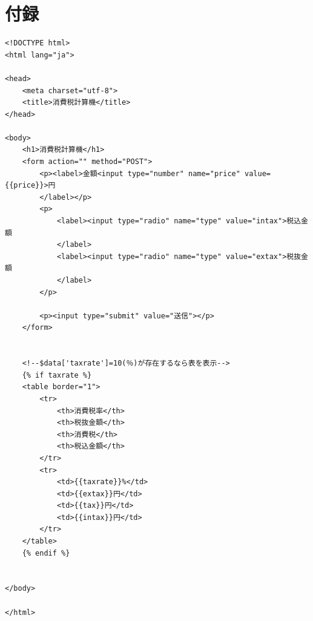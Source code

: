 \documentclass[12pt]{jarticle}
\begin{document}
\section{付録}
\begin{lstlisting}[style = lsthtml,caption=tax.html]
<!DOCTYPE html>
<html lang="ja">

<head>
    <meta charset="utf-8">
    <title>消費税計算機</title>
</head>

<body>
    <h1>消費税計算機</h1>
    <form action="" method="POST">
        <p><label>金額<input type="number" name="price" value={{price}}>円
        </label></p>
        <p>
            <label><input type="radio" name="type" value="intax">税込金額
            </label>
            <label><input type="radio" name="type" value="extax">税抜金額
            </label>
        </p>

        <p><input type="submit" value="送信"></p>
    </form>


    <!--$data['taxrate']=10(％)が存在するなら表を表示-->
    {% if taxrate %}
    <table border="1">
        <tr>
            <th>消費税率</th>
            <th>税抜金額</th>
            <th>消費税</th>
            <th>税込金額</th>
        </tr>
        <tr>
            <td>{{taxrate}}%</td>
            <td>{{extax}}円</td>
            <td>{{tax}}円</td>
            <td>{{intax}}円</td>
        </tr>
    </table>
    {% endif %}


</body>

</html>
\end{lstlisting}

\clearpage
\end{document}
